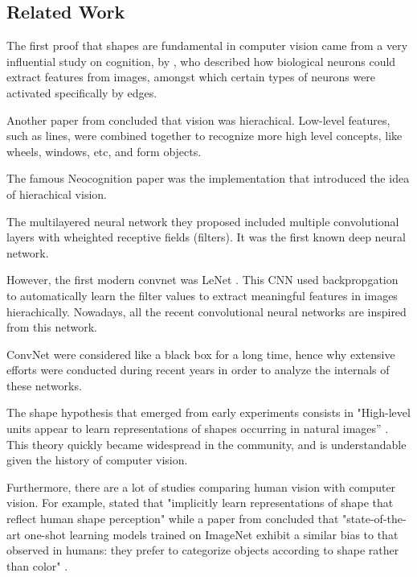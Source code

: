 \documentclass{article}
\begin{document}
\subsection{Related Work}

\noindent
The first proof that shapes are fundamental in computer vision came from a very influential study on cognition, 
by \cite{hubel1959receptive}, who described how biological neurons could extract features from images,
amongst which certain types of neurons were activated specifically by edges. \medskip \par 

\noindent 
Another paper from \cite{marr1982vision} concluded that vision was hierachical. Low-level features, such as lines,
were combined together to recognize more high level concepts, 
like wheels, windows, etc, and form objects. \medskip \par 

\noindent
The famous Neocognition paper \cite{neocognitron} was 
the implementation that introduced the idea of hierachical vision. 

\noindent
The multilayered neural network they proposed 
included multiple convolutional layers with wheighted receptive fields (filters).
It was the first known deep neural network. \medskip \par

\noindent
However, the first modern convnet was LeNet \cite{Lecun98gradient-basedlearning}.
This CNN used backpropgation to automatically learn the filter values to extract meaningful 
features in images hierachically.
Nowadays, all the recent convolutional neural networks are inspired from this network. \medskip \par

\noindent
ConvNet were considered like a black box for a long time, 
hence why extensive efforts were conducted during recent years in order 
to analyze the internals of these networks. \medskip \par

\noindent
The shape hypothesis that emerged from early experiments consists in
"High-level units appear to learn representations of shapes occurring in natural images” 
\cite{Kriegeskorte029876}. This theory quickly became widespread in the community, and
is understandable given the history of computer vision. \medskip \par

\noindent
Furthermore, there are a lot of studies comparing human vision with computer vision. For example,
\cite{kubiliusshape} stated that 
"implicitly learn representations of shape that reflect human shape perception"
while a paper from \cite{ritter2017cognitive} concluded that 
"state-of-the-art one-shot learning models trained on ImageNet exhibit  
a similar bias to that observed in humans: they prefer to categorize objects according  
to shape rather than color" . \medskip \par
\end{document}
